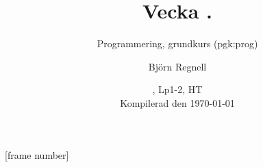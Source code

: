 [frame number]



\title[Föreläsning i ''Programmering, grundkurs'', Björn Regnell, senast uppdaterad: \today]{Vecka \vecka. \veckotema}
\subtitle{Programmering, grundkurs (pgk:prog)}
\author{Björn Regnell}
\date{\CourseCode, Lp1-2, HT\CurrentYear\\{\vspace{1em}\tiny Kompilerad den \today}}


